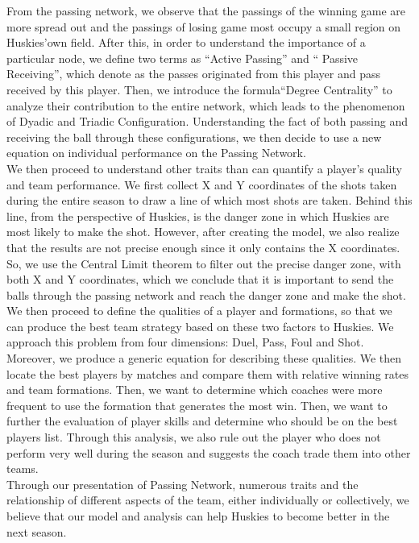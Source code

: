 \documentclass[12pt]{article}
\begin{document}
	From the passing network, we observe that the passings of the winning game are more spread out and the passings of losing game most occupy a small region on Huskies’own field. 
After this, in order to understand the importance of a particular node, we define two terms as “Active Passing” and “ Passive Receiving”, which denote as the passes originated from this player and pass received by this player. Then, we introduce the formula“Degree Centrality” to analyze their contribution to the entire network, which leads to the phenomenon of Dyadic and Triadic Configuration. Understanding the fact of both passing and receiving the ball through these configurations, we then decide to use a new equation on individual performance on the Passing Network.\\
\newline
	We then proceed to understand other traits than can quantify a player’s quality and team performance. We first collect X and Y coordinates of the shots taken during the entire season to draw a line of which most shots are taken. Behind this line, from the perspective of Huskies, is the danger zone in which Huskies are most likely to make the shot. However, after creating the model, we also realize that the results are not precise enough since it only contains the X coordinates. So, we use the Central Limit theorem to filter out the precise danger zone, with both X and Y coordinates, which we conclude that it is important to send the balls through the passing network and reach the danger zone and make the shot. \\
	\newline
	We then proceed to define the qualities of a player and formations, so that we can produce the best team strategy based on these two factors to Huskies. We approach this problem from four dimensions: Duel, Pass, Foul and Shot. Moreover, we produce a generic equation for describing these qualities. We then locate the best players by matches and compare them with relative winning rates and team formations. Then, we want to determine which coaches were more frequent to use the formation that generates the most win. Then, we want to further the evaluation of player skills and determine who should be on the best players list. Through this analysis, we also rule out the player who does not perform very well during the season and suggests the coach trade them into other teams. \\
	\newline
	Through our presentation of Passing Network, numerous traits and the relationship of different aspects of the team, either individually or collectively, we believe that our model and analysis can help Huskies to become better in the next season. 
\end{document}
